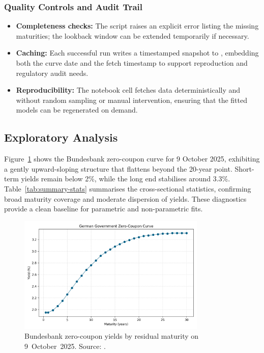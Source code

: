 \documentclass[12pt]{article}
\newcommand{\inlinecode}[1]{\texttt{\detokenize{#1}}}
\begin{document}
\begin{spacing}{1.15}
\subsubsection{Quality Controls and Audit Trail}
\begin{itemize}
    \item \textbf{Completeness checks:} The script raises an explicit error listing the missing maturities; the lookback window can be extended temporarily if necessary.
    \item \textbf{Caching:} Each successful run writes a timestamped snapshot to \inlinecode{data/raw/}, embedding both the curve date and the fetch timestamp to support reproduction and regulatory audit needs.
    \item \textbf{Reproducibility:} The notebook cell fetches data deterministically and without random sampling or manual intervention, ensuring that the fitted models can be regenerated on demand.
\end{itemize}

\end{spacing}

\subsection{Exploratory Analysis}
\begin{spacing}{1.15}
Figure~\ref{fig:raw-curve} shows the Bundesbank zero-coupon curve for 9 October 2025, exhibiting a gently upward-sloping structure that flattens beyond the 20-year point. Short-term yields remain below 2\%, while the long end stabilises around 3.3\%. Table~\ref{tab:summary-stats} summarises the cross-sectional statistics, confirming broad maturity coverage and moderate dispersion of yields. These diagnostics provide a clean baseline for parametric and non-parametric fits.
\end{spacing}

\begin{figure}[htbp]
  \centering
  \includegraphics[width=0.8\textwidth]{../data/output/figure_raw_curve.png}
  \caption{Bundesbank zero-coupon yields by residual maturity on 9~October~2025. Source: \parencite{bundesbank_zero_coupon}.}
  \label{fig:raw-curve}
\end{figure}
\end{document}
